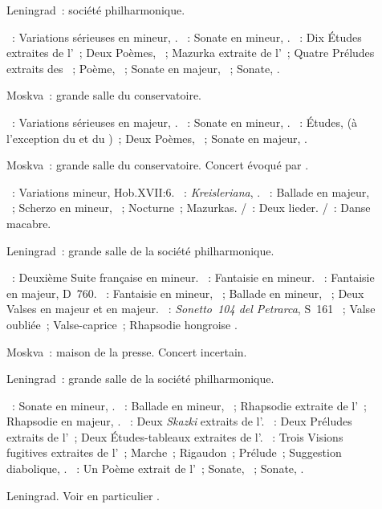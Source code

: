 \begin{description}
 \item[]
 Leningrad~: société philharmonique.

 \textsc{\Mendelssohn{}}~: Variations sérieuses en \kD mineur, .
 \textsc{\Chopin{}}~: Sonate en \kB mineur, .
 \textsc{\Scriabine{}}~: Dix Études extraites de l'~; Deux Poèmes,
 ~; Mazurka extraite de l'~; Quatre Préludes extraits des
 ~; Poème,  ~; Sonate en \kF
 \Sharp majeur, ~; Sonate, .
 \item[]
 Moskva~: grande salle du conservatoire.

 \textsc{\Mendelssohn{}}~: Variations sérieuses en \kD majeur, .
 \textsc{\Chopin{}}~: Sonate en \kB mineur, .
 \textsc{\Scriabine{}}~: Études,  (à l'exception du  et du
 )~; Deux Poèmes, ~; Sonate en \kF \Sharp majeur,
 .
 \item[]
 Moskva~: grande salle du conservatoire.
 Concert évoqué par \citet[p.~247]{Lobanov08a}.

 \textsc{\Haydn{}}~: Variations \kF mineur, Hob.XVII:6.
 \textsc{\Schumann{}}~: \emph{Kreisleriana}, .
 \textsc{\Chopin{}}~: Ballade en \kA \Flat majeur, ~; Scherzo en
 \kC \Sharp mineur, ~; Nocturne~; Mazurkas.
 \textsc{\Schubert{}/\Liszt{}}~: Deux lieder.
 \textsc{\SaintSaens{}/\Liszt{}}~: Danse macabre.
 \item[]
 Leningrad~: grande salle de la société philharmonique.

 \textsc{\JBach{}}~: Deuxième Suite française en \kD mineur.
 \textsc{\Mozart{}}~: Fantaisie en \kC mineur.
 \textsc{\Schubert{}}~: Fantaisie  en \kC majeur, D~760.
 \textsc{\Chopin{}}~: Fantaisie en \kF mineur, ~; Ballade en \kG
 mineur, ~; Deux Valses en \kA \Flat majeur et en \kE \Flat majeur.
 \textsc{\Liszt{}}~: \emph{Sonetto~104 del Petrarca}, S~161 ~;
 Valse oubliée~; Valse-caprice~; Rhapsodie hongroise .
 \item[]
 Moskva~: maison de la presse.
 Concert incertain.
 \item[]
 Leningrad~: grande salle de la société philharmonique.

 \textsc{\Schumann{}}~: Sonate en \kG mineur, .
 \textsc{\Brahms{}}~: Ballade en \kG mineur,  ~;
 Rhapsodie extraite de l'~; Rhapsodie en \kE \Flat majeur,
  .
 \textsc{\Medtner{}}~: Deux \emph{Skazki} extraits de l'.
 \textsc{\Rachmaninov{}}~: Deux Préludes extraits de l'~; Deux
 Études-tableaux extraites de l'.
 \textsc{\Prokofiev{}}~: Trois Visions fugitives extraites de l'~;
 Marche~; Rigaudon~; Prélude~; Suggestion diabolique,  .
 \textsc{\Scriabine{}}~: Un Poème extrait de l'~; Sonate,
 ~; Sonate, .
 \item[]
 Leningrad.
 Voir en particulier \citet[p.~427]{Milshteyn82a}.


\end{description}

